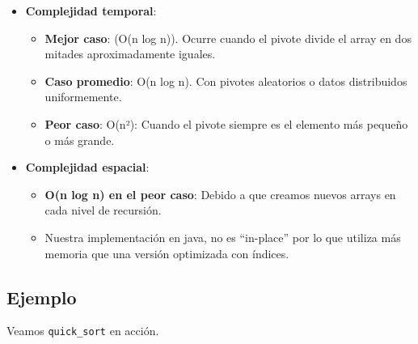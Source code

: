 \documentclass[
  spanish,
  letterpaper,
  DIV=11,
  numbers=noendperiod]{scrreprt}
\providecommand{\tightlist}{%
  \setlength{\itemsep}{0pt}\setlength{\parskip}{0pt}}
\begin{document}
\begin{itemize}
\tightlist
\item
  \textbf{Complejidad temporal}:

  \begin{itemize}
  \tightlist
  \item
    \textbf{Mejor caso}: (O(n log n)). Ocurre cuando el pivote divide el
    array en dos mitades aproximadamente iguales.
  \item
    \textbf{Caso promedio}: O(n log n). Con pivotes aleatorios o datos
    distribuidos uniformemente.
  \item
    \textbf{Peor caso}: O(n²): Cuando el pivote siempre es el elemento
    más pequeño o más grande.
  \end{itemize}
\item
  \textbf{Complejidad espacial}:

  \begin{itemize}
  \tightlist
  \item
    \textbf{O(n log n) en el peor caso}: Debido a que creamos nuevos
    arrays en cada nivel de recursión.
  \item
    Nuestra implementación en java, no es ``in-place'' por lo que
    utiliza más memoria que una versión optimizada con índices.
  \end{itemize}
\end{itemize}

\subsection{Ejemplo}\label{ejemplo-5}

Veamos \texttt{quick\_sort} en acción.
\end{document}

